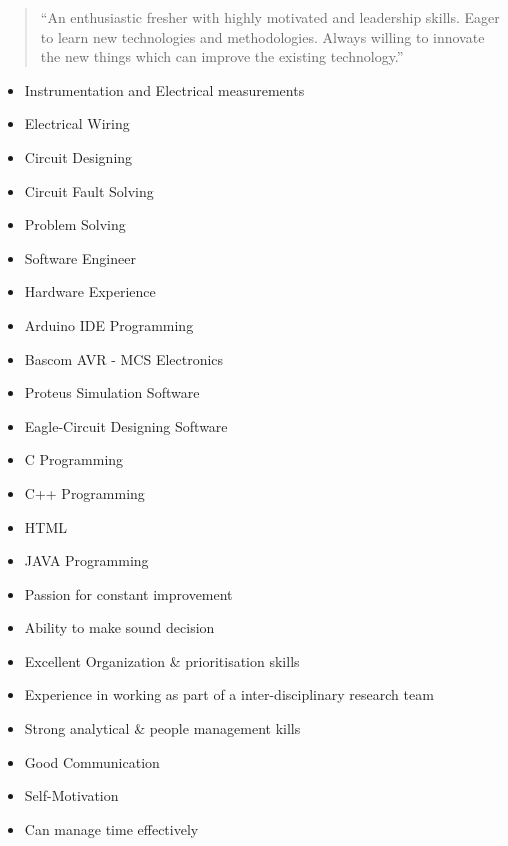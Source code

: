 
\begin{quote}
``An enthusiastic fresher with highly motivated and leadership skills. Eager to learn new technologies and methodologies. Always willing to innovate the new things which can improve the existing technology.''
\end{quote}
\begin{itemize}
    \item Instrumentation and Electrical measurements
    \item Electrical Wiring
    \item Circuit Designing
    \item Circuit Fault Solving
    \item Problem Solving
    \item Software Engineer
    \item Hardware Experience
\end{itemize}
\begin{itemize}
    \item Arduino IDE Programming
    \item Bascom AVR - MCS Electronics
    \item Proteus Simulation Software
    \item Eagle-Circuit Designing Software
    \item C Programming
    \item C++ Programming
    \item HTML
    \item JAVA Programming
\end{itemize}
\begin{itemize}
    \item Passion for constant improvement
    \item Ability to make sound decision
    \item Excellent Organization \& prioritisation skills
    \item Experience in working as part of a inter-disciplinary research team
    \item Strong analytical \& people management kills
    \item Good Communication
    \item Self-Motivation
    \item Can manage time effectively
    
\end{itemize}

\medskip